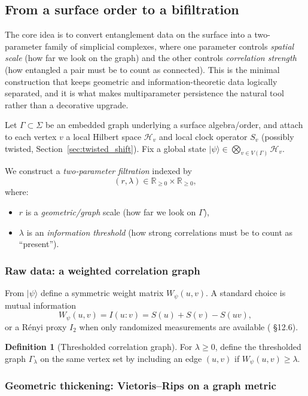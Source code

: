 \documentclass[11pt,oneside]{amsbook}
\numberwithin{equation}{section}
\theoremstyle{plain}
\theoremstyle{definition}
\newtheorem{definition}[theorem]{Definition}
\theoremstyle{remark}
\newcommand{\RR}{\mathbb{R}}
\newcommand{\cH}{\mathcal{H}}
\begin{document}
\subsection{From a surface order to a bifiltration}
\label{sec:bifiltration_from_order}

The core idea is to convert entanglement data on the surface into a two-parameter family of simplicial complexes, where one parameter controls \emph{spatial scale} (how far we look on the graph) and the other controls \emph{correlation strength} (how entangled a pair must be to count as connected).  This is the minimal construction that keeps geometric and information-theoretic data logically separated, and it is what makes multiparameter persistence the natural tool rather than a decorative upgrade.

Let $\Gamma\subset \Sigma$ be an embedded graph underlying a surface algebra/order, and attach to each vertex $v$ a local Hilbert space $\cH_v$ and local clock operator $S_v$ (possibly twisted, Section~\ref{sec:twisted_shift}).
Fix a global state $|\psi\rangle\in \bigotimes_{v\in V(\Gamma)}\cH_v$.

We construct a \emph{two-parameter filtration} indexed by
\[
(r,\lambda)\in \RR_{\ge 0}\times \RR_{\ge 0},
\]
where:
\begin{itemize}
\item $r$ is a \emph{geometric/graph} scale (how far we look on $\Gamma$),
\item $\lambda$ is an \emph{information threshold} (how strong correlations must be to count as ``present'').
\end{itemize}

\subsubsection{Raw data: a weighted correlation graph}

From $|\psi\rangle$ define a symmetric weight matrix $W_\psi(u,v)$.
A standard choice is mutual information
\[
W_\psi(u,v)=I(u\!:\!v)=S(u)+S(v)-S(uv),
\]
or a Rényi proxy $I_2$ when only randomized measurements are available ( \S12.6).

\begin{definition}[Thresholded correlation graph]
For $\lambda\ge 0$, define the thresholded graph $\Gamma_\lambda$ on the same vertex set by including an edge $(u,v)$ if $W_\psi(u,v)\ge \lambda$.
\end{definition}

\subsubsection{Geometric thickening: Vietoris--Rips on a graph metric}
\end{document}
